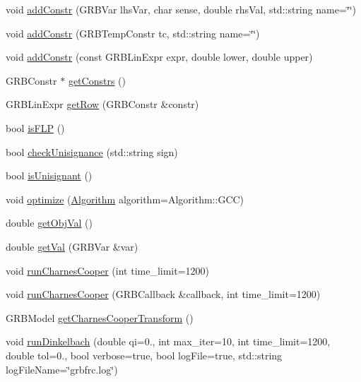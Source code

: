 \begin{DoxyCompactItemize}
\item 
void \hyperlink{classgrbfrc_1_1FMILP_a6f3cdbb13550f21b6d3f6d4403b500fb}{add\+Constr} (G\+R\+B\+Var lhs\+Var, char sense, double rhs\+Val, std\+::string name=\char`\"{}\char`\"{})
\item 
void \hyperlink{classgrbfrc_1_1FMILP_ababc0c8768b8b5bf318d7e4b6598e821}{add\+Constr} (G\+R\+B\+Temp\+Constr tc, std\+::string name=\char`\"{}\char`\"{})
\item 
void \hyperlink{classgrbfrc_1_1FMILP_a98f89f58f1909632b96518dfd6b284b0}{add\+Constr} (const G\+R\+B\+Lin\+Expr expr, double lower, double upper)
\item 
G\+R\+B\+Constr $\ast$ \hyperlink{classgrbfrc_1_1FMILP_aa6a2087036235f6255f9f779e2303768}{get\+Constrs} ()
\item 
G\+R\+B\+Lin\+Expr \hyperlink{classgrbfrc_1_1FMILP_a13b7ccccee5b9592cb5a15830c0f06c7}{get\+Row} (G\+R\+B\+Constr \&constr)
\item 
bool \hyperlink{classgrbfrc_1_1FMILP_a4a7dfcc68142d75ef7d19c9856658f59}{is\+F\+LP} ()
\item 
bool \hyperlink{classgrbfrc_1_1FMILP_a1aeef936dc377addedfd5bffcf525213}{check\+Unisignance} (std\+::string sign)
\item 
bool \hyperlink{classgrbfrc_1_1FMILP_aaf641eb8a257ea33eeaf96a317e74138}{is\+Unisignant} ()
\item 
void \hyperlink{classgrbfrc_1_1FMILP_a5265d37ac0930ebd9b0da68c0c326aaa}{optimize} (\hyperlink{namespacegrbfrc_a032175e688b11ec611d637a145c6dfc3}{Algorithm} algorithm=Algorithm\+::\+G\+CC)
\item 
double \hyperlink{classgrbfrc_1_1FMILP_acb4fb29dd992dc066940d84bb5c29c34}{get\+Obj\+Val} ()
\item 
double \hyperlink{classgrbfrc_1_1FMILP_a4c11488e9204c757cacee7f45467c635}{get\+Val} (G\+R\+B\+Var \&var)
\item 
void \hyperlink{classgrbfrc_1_1FMILP_a92b0bbd1d64a2de0d49b5a8954a217b4}{run\+Charnes\+Cooper} (int time\+\_\+limit=1200)
\item 
void \hyperlink{classgrbfrc_1_1FMILP_a6ab31a732827b5d1df16a16058aeec1f}{run\+Charnes\+Cooper} (G\+R\+B\+Callback \&callback, int time\+\_\+limit=1200)
\item 
G\+R\+B\+Model \hyperlink{classgrbfrc_1_1FMILP_a1f6d8f2107c6d716c22aa0817e0a13d2}{get\+Charnes\+Cooper\+Transform} ()
\item 
void \hyperlink{classgrbfrc_1_1FMILP_a4a5ba754ac4e88ec64cd739ed82d5134}{run\+Dinkelbach} (double qi=0., int max\+\_\+iter=10, int time\+\_\+limit=1200, double tol=0., bool verbose=true, bool log\+File=true, std\+::string log\+File\+Name=\char`\"{}grbfrc.\+log\char`\"{})

\end{DoxyCompactItemize}
